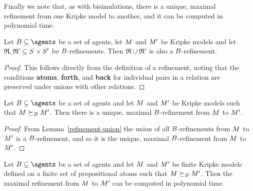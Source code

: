 Finally we note that, as with bisimulations, there is a unique, maximal refinement from one Kripke model to another, and it can be computed in polynomial time.

\begin{lemma}\label{refinement-union}
Let $\agentsB \subseteq \agents$ be a set of agents, let $\kModel$ and ${M^{\prime}_{}}$ be Kripke models and let $\refinement, \refinement' \subseteq \kStates \times \kStatesP$ be $B$-refinements.
Then $\mathfrak{R} \cup \mathfrak{R}'$ is also a $B$-refinement.
\end{lemma}

\begin{proof}
This follows directly from the definition of a refinement, noting that the conditions {\bf atoms}, {\bf forth}, and {\bf back} for individual pairs in a relation are preserved under unions with other relations.
\end{proof}

\begin{proposition}
Let $\agentsB \subseteq \agents$ be a set of agents and let $\kModel$ and ${M^{\prime}_{}}$ be Kripke models such that $\kModel \simulatesBs \kModelP$.
Then there is a unique, maximal $B$-refinement from $\kModel$ to ${M^{\prime}_{}}$.
\end{proposition}

\begin{proof}
From Lemma~\ref{refinement-union} the union of all $B$-refinements from $\kModel$ to ${M^{\prime}_{}}$ is a $B$-refinement, and so it is the unique, maximal $B$-refinement from $\kModel$ to ${M^{\prime}_{}}$.
\end{proof}

\begin{proposition}
Let $\agentsB \subseteq \agents$ be a set of agents and let $\kModel$ and ${M^{\prime}_{}}$ be finite Kripke models defined on a finite set of propositional atoms such that $\kModel \simulatesBs \kModelP$.
Then the maximal refinement from $\kModel$ to ${M^{\prime}_{}}$ can be computed in polynomial time.
\end{proposition}

